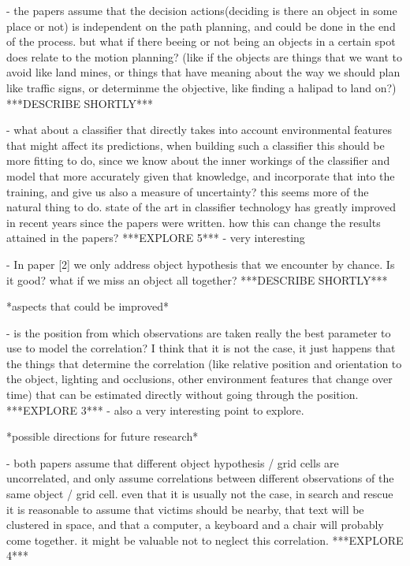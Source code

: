\documentclass{article}
\begin{document}
	- the papers assume that the decision actions(deciding is there an object in some place or not) is independent on the path planning, and could be done in the end of the process. but what if there beeing or not being an objects in a certain spot does relate to the motion planning? (like if the objects are things that we want to avoid like land mines, or things that have meaning about the way we should plan like traffic signs, or determinme the objective, like finding a halipad to land on?) 
	***DESCRIBE SHORTLY***
	
	- what about a classifier that directly takes into account environmental features that might affect its predictions, when building such a classifier this should be more fitting to do, since we know about the inner workings of the classifier and model that more accurately given that knowledge, and incorporate that into the training, and give us also a measure of uncertainty? this seems more of the natural thing to do. state of the art in classifier technology has greatly improved in recent years since the papers were written. how this can change the results attained in the papers?
	***EXPLORE 5*** - very interesting
	
	- In paper [2] we only address object hypothesis that we encounter by chance. Is it good? what if we miss an object all together?
	***DESCRIBE SHORTLY***
	
	*aspects that could be improved*
	
	- is the position from which observations are taken really the best parameter to use to model the correlation? I think that it is not the case, it just happens that the things that determine the correlation (like relative position and orientation to the object, lighting and occlusions, other environment features that change over time) that can be estimated directly without going through the position.
	***EXPLORE 3*** - also a very interesting point to explore.	
		
	*possible directions for future research*
	
	- both papers assume that different object hypothesis / grid cells are uncorrelated, and only assume correlations between different observations of the same object / grid cell. even that it is usually not the case, in search and rescue it is reasonable to assume that victims should be nearby, that text will be clustered in space, and that a computer, a keyboard and a chair will probably come together. it might be valuable not to neglect this correlation.
	***EXPLORE 4***
	
\end{document}
